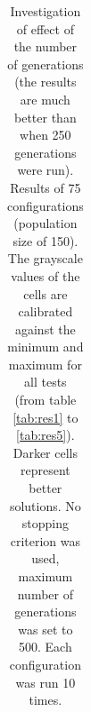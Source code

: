 \begin{table}[H]
\begin{tabular}{ccc|c|c|c|c|c}
\end{tabular}
\caption{Investigation of effect of the number of generations (the results are much better than when 250 generations were run). Results of 75 configurations (population size of 150). The grayscale values of the cells are calibrated against the minimum and maximum for all tests (from table \ref{tab:res1} to \ref{tab:res5}). Darker cells represent better solutions. No stopping criterion was used, maximum number of generations was set to 500. Each configuration was run 10 times.}
\label{tab:res4}
\end{table}


